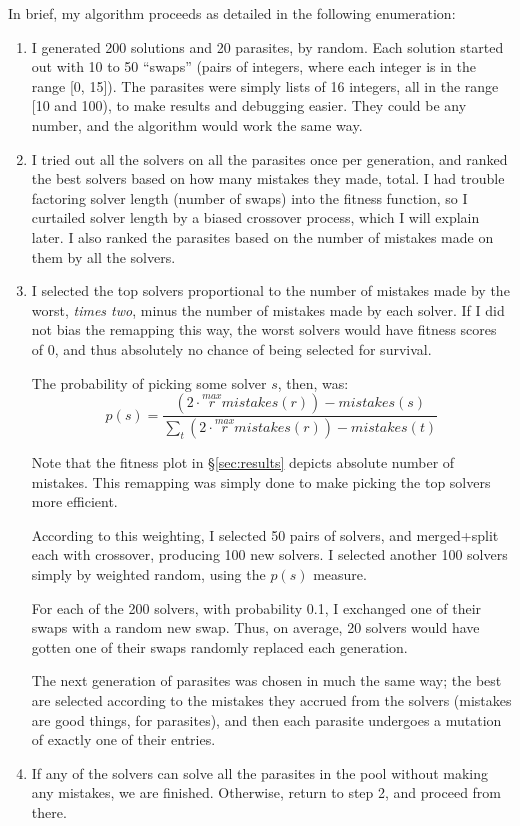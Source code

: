 \documentclass[11pt]{article}
\begin{document}
In brief, my algorithm proceeds as detailed in the following enumeration:
\begin{enumerate}[1.]
  \item I generated 200 solutions and 20 parasites, by random. Each solution started out with 10 to 50 ``swaps'' (pairs of integers, where each integer is in the range [0, 15]). The parasites were simply lists of 16 integers, all in the range [10 and 100), to make results and debugging easier. They could be any number, and the algorithm would work the same way.
  \item I tried out all the solvers on all the parasites once per generation, and ranked the best solvers based on how many mistakes they made, total. I had trouble factoring solver length (number of swaps) into the fitness function, so I curtailed solver length by a biased crossover process, which I will explain later. I also ranked the parasites based on the number of mistakes made on them by all the solvers.
  \item I selected the top solvers proportional to the number of mistakes made by the worst, \emph{times two}, minus the number of mistakes made by each solver. If I did not bias the remapping this way, the worst solvers would have fitness scores of 0, and thus absolutely no chance of being selected for survival.

  The probability of picking some solver $s$, then, was:
  \[
    p(s) = \frac{(2 \cdot \stackrel{max}{r} mistakes(r)) - mistakes(s)}{\sum_t (2 \cdot \stackrel{max}{r} mistakes(r)) -mistakes(t)}
  \]

  Note that the fitness plot in \S\ref{sec:results} depicts absolute number of mistakes. This remapping was simply done to make picking the top solvers more efficient.

  According to this weighting, I selected 50 pairs of solvers, and merged+split each with crossover, producing 100 new solvers. I selected another 100 solvers simply by weighted random, using the $p(s)$ measure.

  For each of the 200 solvers, with probability 0.1, I exchanged one of their swaps with a random new swap. Thus, on average, 20 solvers would have gotten one of their swaps randomly replaced each generation.

  The next generation of parasites was chosen in much the same way; the best are selected according to the mistakes they accrued from the solvers (mistakes are good things, for parasites), and then each parasite undergoes a mutation of exactly one of their entries.
  \item If any of the solvers can solve all the parasites in the pool without making any mistakes, we are finished. Otherwise, return to step 2, and proceed from there.
\end{enumerate}
\end{document}
